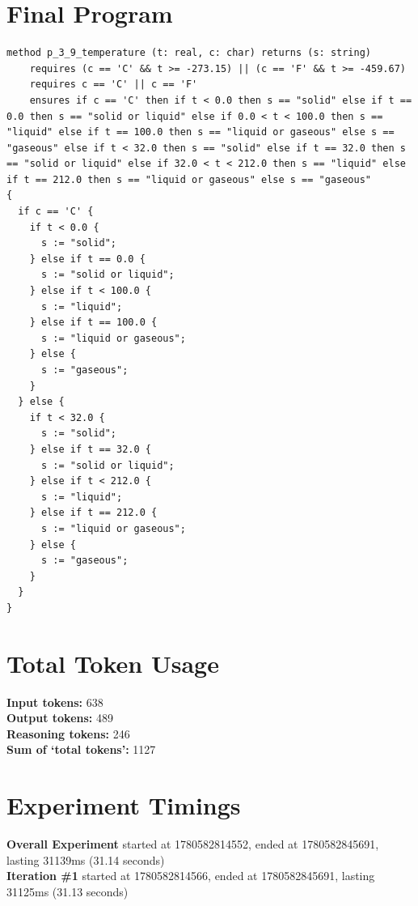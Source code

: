 \documentclass{article}
\begin{document}
\section*{Final Program}
\begin{lstlisting}
method p_3_9_temperature (t: real, c: char) returns (s: string)
	requires (c == 'C' && t >= -273.15) || (c == 'F' && t >= -459.67)
	requires c == 'C' || c == 'F'
	ensures if c == 'C' then if t < 0.0 then s == "solid" else if t == 0.0 then s == "solid or liquid" else if 0.0 < t < 100.0 then s == "liquid" else if t == 100.0 then s == "liquid or gaseous" else s == "gaseous" else if t < 32.0 then s == "solid" else if t == 32.0 then s == "solid or liquid" else if 32.0 < t < 212.0 then s == "liquid" else if t == 212.0 then s == "liquid or gaseous" else s == "gaseous"
{
  if c == 'C' {
    if t < 0.0 {
      s := "solid";
    } else if t == 0.0 {
      s := "solid or liquid";
    } else if t < 100.0 {
      s := "liquid";
    } else if t == 100.0 {
      s := "liquid or gaseous";
    } else {
      s := "gaseous";
    }
  } else {
    if t < 32.0 {
      s := "solid";
    } else if t == 32.0 {
      s := "solid or liquid";
    } else if t < 212.0 {
      s := "liquid";
    } else if t == 212.0 {
      s := "liquid or gaseous";
    } else {
      s := "gaseous";
    }
  }
}
\end{lstlisting}
\section*{Total Token Usage}
\textbf{Input tokens: }638
\\\textbf{Output tokens: }489
\\\textbf{Reasoning tokens: }246
\\\textbf{Sum of `total tokens': }1127
\section*{Experiment Timings}
\textbf{Overall Experiment} started at 1780582814552, ended at 1780582845691, lasting 31139ms (31.14 seconds)
\\\textbf{Iteration \#1} started at 1780582814566, ended at 1780582845691, lasting 31125ms (31.13 seconds)
\end{document}
